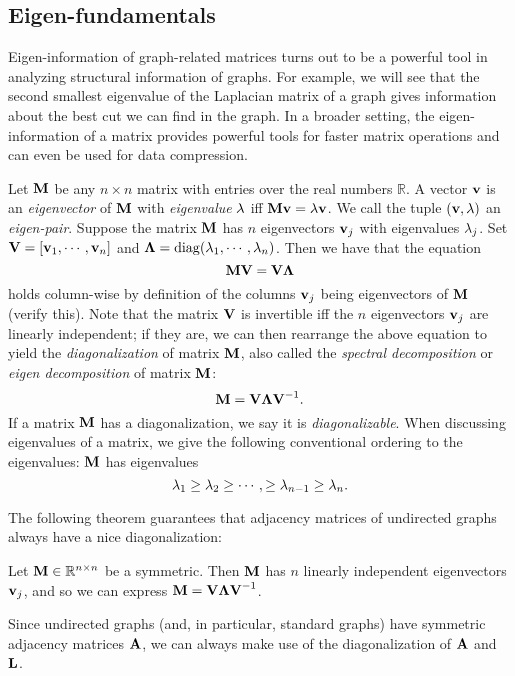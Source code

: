 \subsection{Eigen-fundamentals}\label{sec:fundamentals:eigen}

Eigen-information of graph-related matrices turns out to be a powerful tool in analyzing structural information of graphs. For example, we will see that the second smallest eigenvalue of the Laplacian matrix of a graph gives information about the best cut we can find in the graph. In a broader setting, the eigen-information of a matrix provides powerful tools for faster matrix operations and can even be used for data compression.


Let $\textbf{M}$ be any $n \times n$ matrix with entries over the real numbers $\mathbb{R}$. A vector $\textbf{v}$ is an \emph{eigenvector} of $\textbf{M}$ with \emph{eigenvalue} $\lambda$ iff $\textbf{M}\textbf{v} = \lambda \textbf{v}$. We call the tuple $(\textbf{v}, \lambda)$ an \emph{eigen-pair}. Suppose the matrix $\textbf{M}$ has $n$ eigenvectors $\textbf{v}_j$ with eigenvalues $\lambda_j$. Set $\textbf{V} = [\textbf{v}_1, \cdots, \textbf{v}_n]$ and $\boldsymbol{\Lambda} = \operatorname{diag}(\lambda_1, \cdots, \lambda_n)$. Then we have that the equation
\[
\textbf{M}\textbf{V} = \textbf{V}\boldsymbol{\Lambda}
\]
holds column-wise by definition of the columns $\textbf{v}_j$ being eigenvectors of $\textbf{M}$ (verify this). Note that the matrix $\textbf{V}$ is invertible iff the $n$ eigenvectors $\textbf{v}_j$ are linearly independent; if they are, we can then rearrange the above equation to yield the \emph{diagonalization} of matrix $\textbf{M}$, also called the \emph{spectral decomposition} or \emph{eigen decomposition} of matrix $\textbf{M}$:
\begin{equation}\label{eqn:spectraldecomposition}
\textbf{M} = \textbf{V} \boldsymbol{\Lambda} \textbf{V}^{-1}.
\end{equation}
If a matrix $\textbf{M}$ has a diagonalization, we say it is \emph{diagonalizable}. When discussing eigenvalues of a matrix, we give the following conventional ordering to the eigenvalues: $\textbf{M}$ has eigenvalues \[\lambda_1 \geq \lambda_2 \geq \cdots, \geq \lambda_{n-1} \geq \lambda_n.\]

The following theorem guarantees that adjacency matrices of undirected graphs always have a nice diagonalization:
\begin{theorem}\label{thm:symmetric-diagonalizable}
  Let $\textbf{M} \in \mathbb{R}^{n \times n}$ be a symmetric. Then $\textbf{M}$ has $n$ linearly independent eigenvectors $\textbf{v}_j$, and so we can express $\textbf{M} = \textbf{V} \boldsymbol{\Lambda} \textbf{V}^{-1}$.
\end{theorem}
Since undirected graphs (and, in particular, standard graphs) have symmetric adjacency matrices $\textbf{A}$, we can always make use of the diagonalization of $\textbf{A}$ and $\textbf{L}$.

